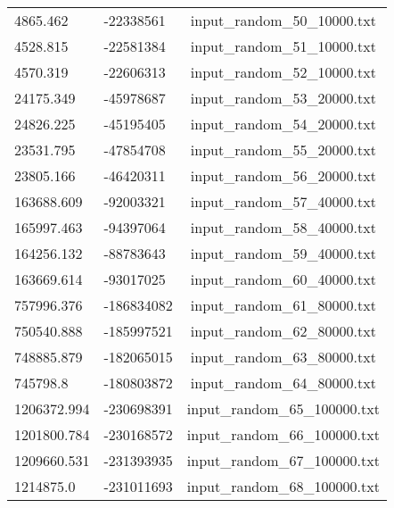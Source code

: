 \begin{longtable}[hb]{|l|l|c|}
    4865.462 & -22338561 & input\_random\_50\_10000.txt \\
    4528.815 & -22581384 & input\_random\_51\_10000.txt \\
    4570.319 & -22606313 & input\_random\_52\_10000.txt \\
    24175.349 & -45978687 & input\_random\_53\_20000.txt \\
    24826.225 & -45195405 & input\_random\_54\_20000.txt \\
    23531.795 & -47854708 & input\_random\_55\_20000.txt \\
    23805.166 & -46420311 & input\_random\_56\_20000.txt \\
    163688.609 & -92003321 & input\_random\_57\_40000.txt \\
    165997.463 & -94397064 & input\_random\_58\_40000.txt \\
    164256.132 & -88783643 & input\_random\_59\_40000.txt \\
    163669.614 & -93017025 & input\_random\_60\_40000.txt \\
    757996.376 & -186834082 & input\_random\_61\_80000.txt \\
    750540.888 & -185997521 & input\_random\_62\_80000.txt \\
    748885.879 & -182065015 & input\_random\_63\_80000.txt \\
    745798.8 & -180803872 & input\_random\_64\_80000.txt \\
    1206372.994 & -230698391 & input\_random\_65\_100000.txt \\
    1201800.784 & -230168572 & input\_random\_66\_100000.txt \\
    1209660.531 & -231393935 & input\_random\_67\_100000.txt \\
    1214875.0 & -231011693 & input\_random\_68\_100000.txt \\
    \hline
\end{longtable}
